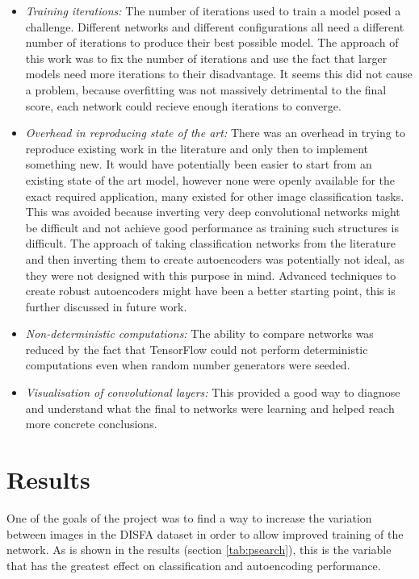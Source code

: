     \begin{itemize}
      \item \textit{Training iterations: }
        The number of iterations used to train a model posed a challenge. Different networks
        and different configurations all need a different number of iterations to produce their
        best possible model. The approach of this work was to fix the number of iterations
        and use the fact that larger models need more iterations to their disadvantage.
        It seems this did not cause a problem, because overfitting was not massively detrimental to the final score, each network could recieve enough iterations to converge.
      \item \textit{Overhead in reproducing state of the art:}
        There was an overhead in trying to reproduce existing work in the literature
        and only then to implement something new. It would have potentially been easier
        to start from an existing state of the art model, however none were openly available
        for the exact required application, many existed for other image classification tasks.
        This was avoided because inverting very deep convolutional networks might be difficult
        and not achieve good performance as training such structures is difficult.
        The approach of taking classification networks from the literature and then
        inverting them to create autoencoders was potentially not ideal, as they
        were not designed with this purpose in mind. Advanced techniques to create robust
        autoencoders might have been a better starting point, this is further discussed in future work.
      \item \textit{Non-deterministic computations:}
        The ability to compare networks was reduced by the fact that TensorFlow could
        not perform deterministic computations even when random number generators were
        seeded.
      \item \textit{Visualisation of convolutional layers:}
        This provided a good way to diagnose and understand what the final to networks
        were learning and helped reach more concrete conclusions.
    \end{itemize}



  \section{Results}
    One of the goals of the project was to find a way to increase the variation
    between images in the DISFA dataset in order to allow improved training of the network.
    As is shown in the results (section \ref{tab:psearch}), this is the variable that has
    the greatest effect on classification and autoencoding performance.

